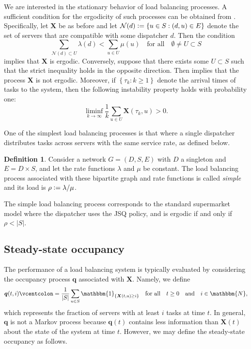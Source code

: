 \documentclass[a4paper, 12pt]{article}
\theoremstyle{definition}
\newtheorem{definition}{Definition}
\newcommand{\ind}[1]{\mathbbm{1}_{\left\{#1\right\}}}
\newcommand{\set}[2]{\left\{#1 : #2\right\}}
\newcommand{\defeq}{\vcentcolon=}
\newcommand{\bq}{\boldsymbol{q}}
\newcommand{\bX}{\boldsymbol{X}}
\newcommand{\calN}{\mathcal{N}}
\newcommand{\N}{\mathbbm{N}}
\begin{document}
We are interested in the stationary behavior of load balancing processes. A sufficient condition for the ergodicity of such processes can be obtained from \cite[Theorem 2.5]{foss1998stability}. Specifically, let $\bX$ be as before and let $\calN(d) \defeq \set{u \in S}{(d, u) \in E}$ denote the set of servers that are compatible with some dispatcher $d$. Then the condition 
\begin{equation}
	\label{eq: ergodicity condition}
	\sum_{\calN(d) \subset U} \lambda(d) < \sum_{u \in U} \mu(u) \quad \text{for all} \quad \emptyset \neq U \subset S
\end{equation}
implies that $\bX$ is ergodic. Conversely, suppose that there exists some $U \subset S$ such that the strict inequality holds in the opposite direction. Then \cite[Theorem 2.7]{foss1998stability} implies that the process $\bX$ is not ergodic. Moreover, if $\set{\tau_k}{k \geq 1}$ denote the arrival times of tasks to the system, then the following instability property holds with probability one:
\begin{equation*}
	\liminf_{k \to \infty} \frac{1}{k}\sum_{u \in U} \bX(\tau_k, u) > 0.
\end{equation*}

One of the simplest load balancing processes is that where a single dispatcher distributes tasks across servers with the same service rate, as defined below.

\begin{definition}
	\label{def: simple load balancing process}
	Consider a network $G = (D, S, E)$ with $D$ a singleton and $E = D \times S$, and let the rate functions $\lambda$ and $\mu$ be constant. The load balancing process associated with these bipartite graph and rate functions is called \emph{simple} and its load is $\rho \defeq \lambda / \mu$.
\end{definition}

The simple load balancing process corresponds to the standard supermarket model where the dispatcher uses the JSQ policy, and is ergodic if and only if $\rho < |S|$.

\subsection{Steady-state occupancy}

The performance of a load balancing system is typically evaluated by considering the occupancy process $\bq$ associated with $\bX$. Namely, we define
\begin{equation*}
	\bq(t, i) \defeq \frac{1}{|S|}\sum_{u \in S} \ind{\bX(t, u) \geq i} \quad \text{for all} \quad t \geq 0 \quad \text{and} \quad i \in \N,
\end{equation*}
which represents the fraction of servers with at least $i$ tasks at time $t$. In general, $\bq$ is not a Markov process because $\bq(t)$ contains less information than $\bX(t)$ about the state of the system at time $t$. However, we may define the steady-state occupancy as follows.
\end{document}
